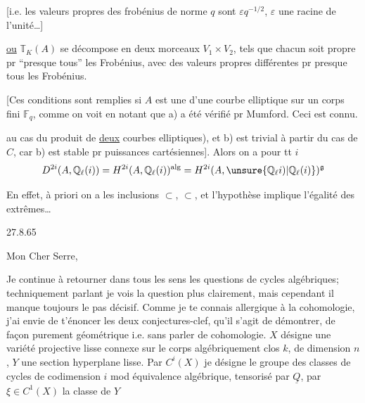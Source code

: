 [i.e. les valeurs propres des frobénius  de norme $q$ sont $\varepsilon q^{-1/2}$, $\varepsilon$ une racine de l'unité\ldots]


\uline{ou} $\mathbb{T}_K(A)$ se décompose en deux morceaux $V_1\times V_2$, tels que chacun soit propre pr ``presque tous'' les Frobénius, avec des valeurs propres différentes pr presque tous les Frobénius.

[Ces conditions sont remplies si $A$ est une   d'une  courbe elliptique  sur un corps fini $\mathbb{F}_q$, comme on voit en notant que a)  a été vérifié pr Mumford. Ceci est connu.



au cas du produit de \uline{deux} courbes elliptiques), et b) est trivial à partir du cas de $C$, car b) est stable pr  puissances cartésiennes]. Alors on a pour tt $i$
\[
D^{2i}(A,\mathbb{Q}_\ell(i))
=H^{2i}(A,\mathbb{Q}_\ell(i))^{\mathrm{alg}}
=H^{2i}(A,\unsure{\mathbb{Q}_\ell i)|\mathbb{Q}_\ell(i)})^{\mathfrak{g}}
\]

En effet,  à priori on a les inclusions $\subset$, $\subset$, et l'hypothèse implique l'égalité des extrêmes\ldots



27.8.65

Mon Cher Serre,

Je continue à retourner dans tous les sens les questions de cycles algébriques; techniquement parlant je vois la question plus clairement, mais cependant il manque toujours le pas décisif. Comme je te connais allergique à la cohomologie, j'ai envie de t'énoncer les deux conjectures-clef, qu'il s'agit de démontrer, de façon purement géométrique i.e. sans parler de cohomologie. $X$ désigne une variété projective lisse connexe sur le corps algébriquement clos $k$, de dimension $n$, $Y$ une section hyperplane lisse. Par $C^i(X)$ je désigne le groupe des classes de cycles de codimension $i$ mod équivalence algébrique, tensorisé par $\underline{Q}$, par $\xi\in C^1(X)$ la classe de $Y$

